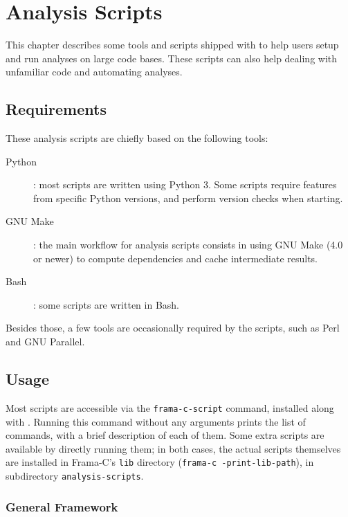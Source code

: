 
\chapter{Analysis Scripts}
\label{user-analysis-scripts}

This chapter describes some tools and scripts shipped with \FramaC to help
users setup and run analyses on large code bases. These scripts can also help
dealing with unfamiliar code and automating analyses.

\section{Requirements}

These analysis scripts are chiefly based on the following tools:

\begin{description}
\item[Python]: most scripts are written using Python 3. Some scripts require
  features from specific Python versions, and perform version checks when
  starting.
\item[GNU Make]: the main workflow for analysis scripts consists in using
  GNU Make (4.0 or newer) to compute dependencies and cache intermediate
  results.
\item[Bash]: some scripts are written in Bash.
\end{description}

Besides those, a few tools are occasionally required by the scripts, such as
Perl and GNU Parallel.

\section{Usage}

Most scripts are accessible via the \texttt{frama-c-script} command, installed
along with \FramaC. Running this command without any arguments prints the list
of commands, with a brief description of each of them. Some extra scripts are
available by directly running them; in both cases, the actual scripts
themselves are installed in Frama-C's \texttt{lib} directory
(\texttt{frama-c -print-lib-path}), in subdirectory \texttt{analysis-scripts}.

\subsection{General Framework}

